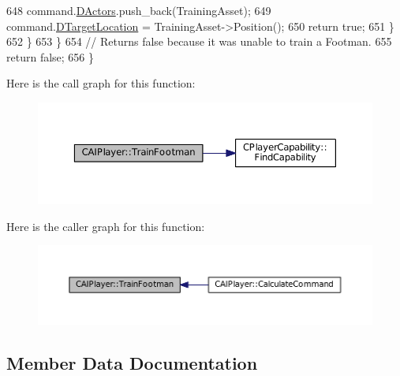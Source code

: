 \begin{DoxyCode}
648                 command.\hyperlink{structSPlayerCommandRequest_aa37fc01519676345703d78b9f573894a}{DActors}.push\_back(TrainingAsset);       
649                 command.\hyperlink{structSPlayerCommandRequest_a701702b94ca2fd2738e95ef6711dd41a}{DTargetLocation} = TrainingAsset->Position();
650                 \textcolor{keywordflow}{return} \textcolor{keyword}{true};
651             \}
652         \}
653     \}
654     \textcolor{comment}{// Returns false because it was unable to train a Footman.}
655     \textcolor{keywordflow}{return} \textcolor{keyword}{false};
656 \}
\end{DoxyCode}
Here is the call graph for this function\+:\nopagebreak
\begin{figure}[H]
\begin{center}
\leavevmode
\includegraphics[width=350pt]{classCAIPlayer_aa3f9c1d0d449a45a24e065d2086527b0_cgraph}
\end{center}
\end{figure}
Here is the caller graph for this function\+:\nopagebreak
\begin{figure}[H]
\begin{center}
\leavevmode
\includegraphics[width=350pt]{classCAIPlayer_aa3f9c1d0d449a45a24e065d2086527b0_icgraph}
\end{center}
\end{figure}


\subsection{Member Data Documentation}
\hypertarget{classCAIPlayer_adf12a7afe7ea86410b18eff47fa95253}{}\label{classCAIPlayer_adf12a7afe7ea86410b18eff47fa95253} 
